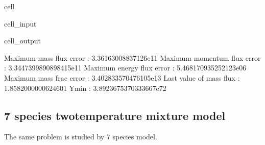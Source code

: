 \documentclass[letterpaper,10pt,english]{jupyterBook}
\begin{document}
\begin{sphinxuseclass}{cell}\begin{sphinxVerbatimInput}

\begin{sphinxuseclass}{cell_input}
\begin{sphinxVerbatim}[commandchars=\\\{\}]
\end{sphinxVerbatim}

\end{sphinxuseclass}\end{sphinxVerbatimInput}
\begin{sphinxVerbatimOutput}

\begin{sphinxuseclass}{cell_output}
\begin{sphinxVerbatim}[commandchars=\\\{\}]
Maximum mass flux error       : 3.36163008837126e\PYGZhy{}11
Maximum momentum flux error   : 3.3447399890898415e\PYGZhy{}11
Maximum energy flux error     : 5.468170935252123e\PYGZhy{}06
Maximum mass frac error       : 3.402833570476105e\PYGZhy{}13
Last value of mass flux       : 1.8582000000624601
Ymin                          : \PYGZhy{}3.8923675370333667e\PYGZhy{}72
\end{sphinxVerbatim}

\noindent{}

\end{sphinxuseclass}\end{sphinxVerbatimOutput}

\end{sphinxuseclass}

\subsection{7 species two\sphinxhyphen{}temperature mixture model}
\label{\detokenize{Results/Results:id1}}
\sphinxAtStartPar
The same problem is studied by 7 species model.
\end{document}
